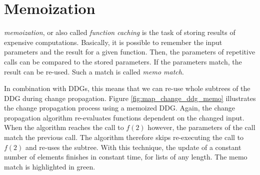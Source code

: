 \section{Memoization}

\textit{memoization}, or also called \textit{function caching} is the task of storing results of expensive computations. Basically, it is possible to remember the input parameters and the result for a given function. Then, the parameters of repetitive calls can be compared to the stored parameters. If the parameters match, the result can be re-used. Such a match is called \textit{memo match}.

In combination with DDGs, this means that we can re-use whole subtrees of the DDG during change propagation. Figure \ref{fig:map_change_ddg_memo} illustrates the change propagation process using a memoized DDG. Again, the change propagation algorithm re-evaluates functions dependent on the changed input. When the algorithm reaches the call to $f(2)$ however, the parameters of the call match the previous call. The algorithm therefore skips re-executing the call to $f(2)$ and re-uses the subtree. With this technique, the update of a constant number of elements finishes in constant time, for lists of any length. 
The memo match is highlighted in green. 

